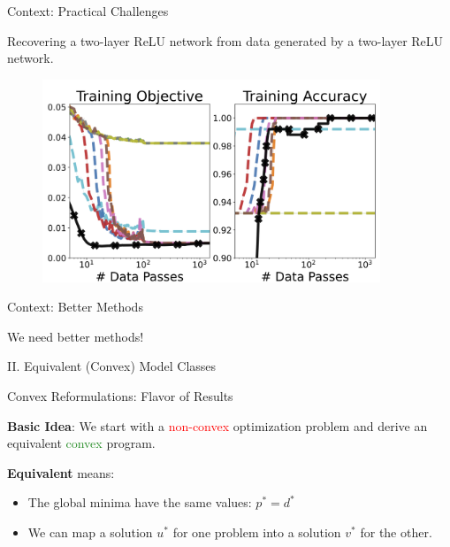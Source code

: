 \documentclass[usenames,dvipsnames,mathserif,notheorems]{beamer}
\newcommand{\red}[1]{\textcolor{Red}{#1}}
\newcommand{\green}[1]{\textcolor{ForestGreen}{#1}}
\begin{document}
\begin{frame}{Context: Practical Challenges}

	\begin{center}
		\large
		Recovering a two-layer ReLU network from data generated by a two-layer ReLU network.
	\end{center}

	\pause

	\begin{figure}[]
		\centering
		\includegraphics[width=0.9\textwidth]{assets/synthetic_classification.png}
	\end{figure}
\end{frame}

\begin{frame}{Context: Better Methods}
	\begin{center}
		{ \huge
			We need better methods!
		}

	\end{center}
\end{frame}



\begin{frame}{}
	\begin{center}
		\huge II. Equivalent (Convex) Model Classes
	\end{center}
\end{frame}

\begin{frame}{Convex Reformulations: Flavor of Results}

	{ \large
		\textbf{Basic Idea}: We start with a \red{non-convex} optimization problem and derive
		an equivalent \green{convex} program.
	}

	\pause
	\vspace{2em}

	\textbf{Equivalent} means:
	\vspace{0.5em}
	\begin{itemize}
		\item The global minima have the same values: \( p^* = d^* \)
		      \vspace{0.5em}
		\item We can map a solution \( u^* \) for one problem into a solution
		      \( v^* \) for the other.
		      \vspace{0.5em}
	\end{itemize}

\end{frame}
\end{document}
